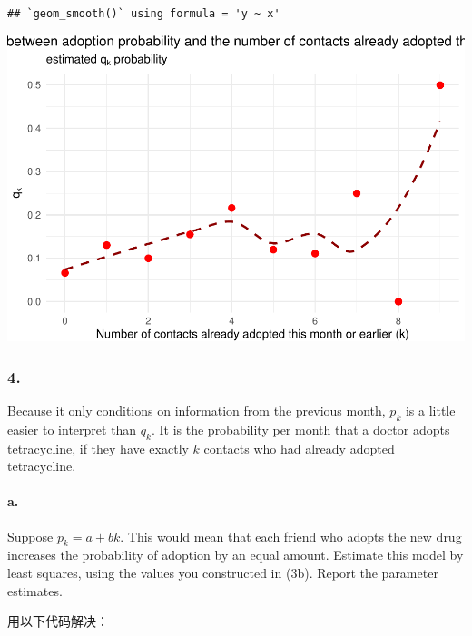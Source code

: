 \documentclass[
]{article}
\begin{document}
\begin{verbatim}
## `geom_smooth()` using formula = 'y ~ x'
\end{verbatim}

\includegraphics{Homework-04_files/figure-latex/unnamed-chunk-4-1.pdf}

\subsubsection{4.}\label{section-3}

Because it only conditions on information from the previous month,
\(p_k\) is a little easier to interpret than \(q_k\). It is the
probability per month that a doctor adopts tetracycline, if they have
exactly \(k\) contacts who had already adopted tetracycline.

\paragraph{a.}\label{a.-1}

Suppose \(p_k = a + bk\). This would mean that each friend who adopts
the new drug increases the probability of adoption by an equal amount.
Estimate this model by least squares, using the values you constructed
in (3b). Report the parameter estimates.

用以下代码解决：
\end{document}

